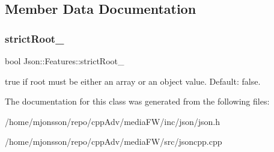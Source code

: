 \subsection{Member Data Documentation}
\mbox{\label{classJson_1_1Features_a1162c37a1458adc32582b585b552f9c3}} 
\subsubsection{\texorpdfstring{strict\+Root\+\_\+}{strictRoot\_}}
{\footnotesize\ttfamily bool Json\+::\+Features\+::strict\+Root\+\_\+}

{\ttfamily true} if root must be either an array or an object value. Default\+: {\ttfamily false}. 

The documentation for this class was generated from the following files\+:\begin{DoxyCompactItemize}
\item 
/home/mjonsson/repo/cpp\+Adv/media\+F\+W/inc/json/json.\+h\item 
/home/mjonsson/repo/cpp\+Adv/media\+F\+W/src/jsoncpp.\+cpp\end{DoxyCompactItemize}
